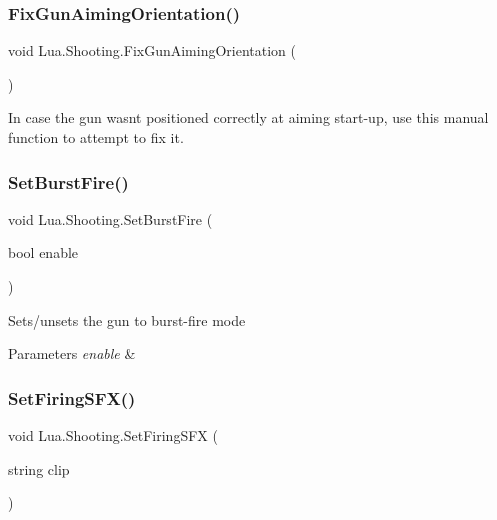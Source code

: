 \subsubsection{\texorpdfstring{FixGunAimingOrientation()}{FixGunAimingOrientation()}}
{\footnotesize\ttfamily void Lua.\+Shooting.\+Fix\+Gun\+Aiming\+Orientation (\begin{DoxyParamCaption}{ }\end{DoxyParamCaption})}



In case the gun wasn\textquotesingle{}t positioned correctly at aiming start-\/up, use this manual function to attempt to fix it. 

\mbox{\label{class_lua_1_1_shooting_af0e7769dd39d32787d3197ebee1a3247}} 
\subsubsection{\texorpdfstring{SetBurstFire()}{SetBurstFire()}}
{\footnotesize\ttfamily void Lua.\+Shooting.\+Set\+Burst\+Fire (\begin{DoxyParamCaption}\item[{bool}]{enable }\end{DoxyParamCaption})}



Sets/unsets the gun to burst-\/fire mode 


\begin{DoxyParams}{Parameters}
{\em enable} & \\
\hline
\end{DoxyParams}
\mbox{\label{class_lua_1_1_shooting_af28162d50b374775ee7618d1cc6c2063}} 
\subsubsection{\texorpdfstring{SetFiringSFX()}{SetFiringSFX()}}
{\footnotesize\ttfamily void Lua.\+Shooting.\+Set\+Firing\+S\+FX (\begin{DoxyParamCaption}\item[{string}]{clip }\end{DoxyParamCaption})}



